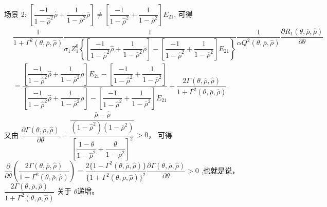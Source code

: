 \documentclass[10.0pt]{article}
\begin{document}
场景 2: {\footnotesize $ \left[ \dfrac{- 1}{1 - {\hat \rho}^2} {\hat \rho} + \dfrac1{1 - \overline{\rho}^2} \overline{\rho} \right] \neq \left[ \dfrac{- 1}{1 - {\hat \rho}^2} + \dfrac1{1 - \overline{\rho}^2} \right] E_{2 1} $}, 可得
{\footnotesize \begin{eqnarray*}
& \dfrac1{1 + \Gamma^2 (\theta, \overline{\rho}, {\hat \rho})} \dfrac1{\sigma_1 Z_1^0 \left\{ \left[ \dfrac{- 1}{1 - {\hat \rho}^2} {\hat \rho} + \dfrac1{1 - \overline{\rho}^2} \overline{\rho} \right] - \left[ \dfrac{- 1}{1 - {\hat \rho}^2} + \dfrac1{1 - \overline{\rho}^2} \right] E_{2 1} \right\}} \dfrac{1}{\alpha Q^2 (\theta, \overline{\rho}, {\hat \rho})} \dfrac{\partial R_1 (\theta, \overline{\rho}, {\hat \rho})}{\partial \theta} & \\
& = \dfrac{\left[ \dfrac{- 1}{1 - {\hat \rho}^2} {\hat \rho} + \dfrac1{1 - \overline{\rho}^2} \overline{\rho} \right] E_{2 1} - \left[ \dfrac{- 1}{1 - {\hat \rho}^2} + \dfrac1{1 - \overline{\rho}^2} \right]}{\left[ \dfrac{- 1}{1 - {\hat \rho}^2} {\hat \rho} + \dfrac1{1 - \overline{\rho}^2} \overline{\rho} \right] - \left[ \dfrac{- 1}{1 - {\hat \rho}^2} + \dfrac1{1 - \overline{\rho}^2} \right] E_{2 1}} + \dfrac{2 \Gamma (\theta, \overline{\rho}, {\hat \rho})}{1 + \Gamma^2 (\theta, \overline{\rho}, {\hat \rho})}. &
\end{eqnarray*}}
又由 {\footnotesize $ \dfrac{\partial \Gamma (\theta, \overline{\rho}, {\hat \rho})}{\partial \theta} = \dfrac{\dfrac{\overline{\rho} - \hat{\rho}}{(1 - {\hat \rho}^2) (1 - \overline{\rho}^2)}}{\left[ \dfrac{1 - \theta}{1 - {\hat \rho}^2} + \dfrac{\theta}{1 - \overline{\rho}^2} \right]^2} > 0 $}， 可得{\footnotesize $ \dfrac{\partial}{\partial \theta} \left( \dfrac{2 \Gamma (\theta, \overline{\rho}, {\hat \rho})}{1 + \Gamma^2 (\theta, \overline{\rho}, {\hat \rho})} \right) = \dfrac{2 \{ 1 - \Gamma^2 (\theta, \overline{\rho}, {\hat \rho}) \}}{\{ 1 + \Gamma^2 (\theta, \overline{\rho}, {\hat \rho}) \}^2} \dfrac{\partial \Gamma (\theta, \overline{\rho}, {\hat \rho})}{\partial \theta} > 0 $} ,也就是说， {\footnotesize $ \dfrac{2 \Gamma (\theta, \overline{\rho}, {\hat \rho})}{1 + \Gamma^2 (\theta, \overline{\rho}, {\hat \rho})} $} 关于 $ \theta $递增。
\end{document}
